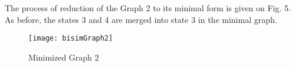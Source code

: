 The process of reduction of the Graph 2 to its minimal form is given on Fig. 5. As before, the states 
3 and 4 are merged into state 3 in the minimal graph.
\begin{figure}[h!]
\centering
\texttt{[image: bisimGraph2]}
\caption{Minimized Graph 2}
\label{fig:bisimGraph2}
\end{figure}

